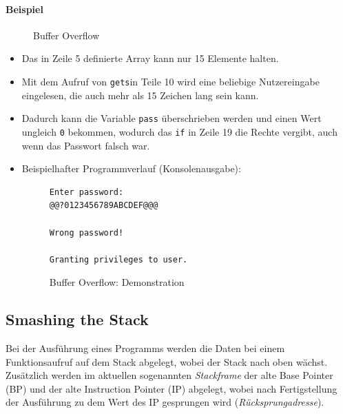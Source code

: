 \documentclass[a4paper, 11pt, accentcolor = tud3b]{tudreport}
\begin{document}
            \paragraph{Beispiel}
	            \begin{figure}[H]
	            	\centering
	            	
	            	\caption{Buffer Overflow}
	            \end{figure}
	            \begin{itemize}
	            	\item Das in Zeile 5 definierte Array kann nur 15 Elemente halten.
	            	\item Mit dem Aufruf von \texttt{gets}in Teile 10 wird eine beliebige Nutzereingabe eingelesen, die auch mehr als 15 Zeichen lang sein kann.
	            	\item Dadurch kann die Variable \texttt{pass} überschrieben werden und einen Wert ungleich \texttt{0} bekommen, wodurch das \texttt{if} in Zeile 19 die Rechte vergibt, auch wenn das Passwort falsch war.
	            	\item Beispielhafter Programmverlauf (Konsolenausgabe):
		            	\begin{figure}[H]
		            		\centering
		            		\begin{lstlisting}[numbers = none]
Enter password:
@@?0123456789ABCDEF@@@

Wrong password!

Granting privileges to user.
\end{lstlisting}
		            		\caption{Buffer Overflow: Demonstration}
		            	\end{figure}
	            \end{itemize}

            \subsection{Smashing the Stack}
                Bei der Ausführung eines Programms werden die Daten bei einem Funktionsaufruf auf dem Stack abgelegt, wobei der Stack nach oben wächst. Zusätzlich werden im aktuellen sogenannten \textit{Stackframe} der alte Base Pointer (BP) und der alte Instruction Pointer (IP) abgelegt, wobei nach Fertigstellung der Ausführung zu dem Wert des IP gesprungen wird (\textit{Rücksprungadresse}).
                
\end{document}

